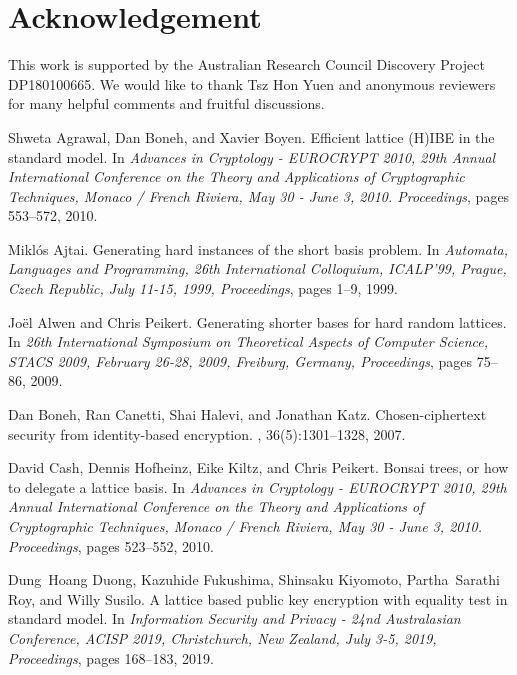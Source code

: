 \documentclass[runningheads]{llncs}
\begin{document}
	
	
\section*{Acknowledgement} This work is supported by the Australian Research Council
Discovery Project DP180100665. We would like to thank Tsz Hon Yuen and anonymous reviewers for many helpful comments and fruitful discussions.


\begin{thebibliography}{99}


Shweta Agrawal, Dan Boneh, and Xavier Boyen.
\newblock Efficient lattice {(H)IBE} in the standard model.
\newblock In {\em Advances in Cryptology - {EUROCRYPT} 2010, 29th Annual
  International Conference on the Theory and Applications of Cryptographic
  Techniques, Monaco / French Riviera, May 30 - June 3, 2010. Proceedings},
  pages 553--572, 2010.

Mikl{\'{o}}s Ajtai.
\newblock Generating hard instances of the short basis problem.
\newblock In {\em Automata, Languages and Programming, 26th International
  Colloquium, ICALP'99, Prague, Czech Republic, July 11-15, 1999, Proceedings},
  pages 1--9, 1999.

Jo{\"{e}}l Alwen and Chris Peikert.
\newblock Generating shorter bases for hard random lattices.
\newblock In {\em 26th International Symposium on Theoretical Aspects of
  Computer Science, {STACS} 2009, February 26-28, 2009, Freiburg, Germany,
  Proceedings}, pages 75--86, 2009.

Dan Boneh, Ran Canetti, Shai Halevi, and Jonathan Katz.
\newblock Chosen-ciphertext security from identity-based encryption.
, 36(5):1301--1328, 2007.

David Cash, Dennis Hofheinz, Eike Kiltz, and Chris Peikert.
\newblock Bonsai trees, or how to delegate a lattice basis.
\newblock In {\em Advances in Cryptology - {EUROCRYPT} 2010, 29th Annual
  International Conference on the Theory and Applications of Cryptographic
  Techniques, Monaco / French Riviera, May 30 - June 3, 2010. Proceedings},
  pages 523--552, 2010.

Dung~Hoang Duong, Kazuhide Fukushima, Shinsaku Kiyomoto, Partha~Sarathi Roy,
  and Willy Susilo.
\newblock A lattice based public key encryption with equality test in standard
  model.
\newblock In {\em Information Security and Privacy - 24nd Australasian
  Conference, {ACISP} 2019, Christchurch, New Zealand, July 3-5, 2019,
  Proceedings}, pages 168--183, 2019.


\end{thebibliography}
\end{document}
